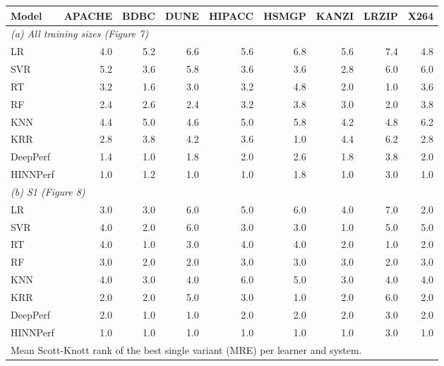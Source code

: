 \begin{tabular}{lrrrrrrrr}
\toprule
Model & APACHE & BDBC & DUNE & HIPACC & HSMGP & KANZI & LRZIP & X264 \\
\midrule
\multicolumn{9}{l}{\textit{(a) All training sizes (Figure 7)}} \\
LR & 4.0 & 5.2 & 6.6 & 5.6 & 6.8 & 5.6 & 7.4 & 4.8 \\
SVR & 5.2 & 3.6 & 5.8 & 3.6 & 3.6 & 2.8 & 6.0 & 6.0 \\
RT & 3.2 & 1.6 & 3.0 & 3.2 & 4.8 & 2.0 & 1.0 & 3.6 \\
RF & 2.4 & 2.6 & 2.4 & 3.2 & 3.8 & 3.0 & 2.0 & 3.8 \\
KNN & 4.4 & 5.0 & 4.6 & 5.0 & 5.8 & 4.2 & 4.8 & 6.2 \\
KRR & 2.8 & 3.8 & 4.2 & 3.6 & 1.0 & 4.4 & 6.2 & 2.8 \\
DeepPerf & 1.4 & 1.0 & 1.8 & 2.0 & 2.6 & 1.8 & 3.8 & 2.0 \\
HINNPerf & 1.0 & 1.2 & 1.0 & 1.0 & 1.8 & 1.0 & 3.0 & 1.0 \\
\midrule
\multicolumn{9}{l}{\textit{(b) S1 (Figure 8)}} \\
LR & 3.0 & 3.0 & 6.0 & 5.0 & 6.0 & 4.0 & 7.0 & 2.0 \\
SVR & 4.0 & 2.0 & 6.0 & 3.0 & 3.0 & 1.0 & 5.0 & 5.0 \\
RT & 4.0 & 1.0 & 3.0 & 4.0 & 4.0 & 2.0 & 1.0 & 2.0 \\
RF & 3.0 & 2.0 & 2.0 & 3.0 & 3.0 & 3.0 & 2.0 & 3.0 \\
KNN & 4.0 & 3.0 & 4.0 & 6.0 & 5.0 & 3.0 & 4.0 & 4.0 \\
KRR & 2.0 & 2.0 & 5.0 & 3.0 & 1.0 & 2.0 & 6.0 & 2.0 \\
DeepPerf & 2.0 & 1.0 & 1.0 & 2.0 & 2.0 & 2.0 & 3.0 & 2.0 \\
HINNPerf & 1.0 & 1.0 & 1.0 & 1.0 & 1.0 & 1.0 & 3.0 & 1.0 \\
\bottomrule
\multicolumn{9}{l}{Mean Scott-Knott rank of the best single variant (MRE) per learner and system.} \\
\end{tabular}
